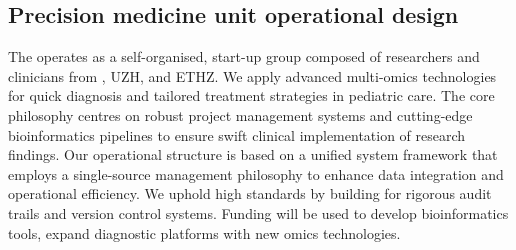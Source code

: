  \subsection{Precision medicine unit operational design}
The  \pmu operates as a self-organised, start-up group composed of researchers and clinicians from \kispi, UZH, and ETHZ.
We apply advanced multi-omics technologies for quick diagnosis and tailored treatment strategies in pediatric care. The core philosophy centres on robust project management systems and cutting-edge bioinformatics pipelines to ensure swift clinical implementation of research findings. 
Our operational structure is based on a unified system framework that employs a single-source management philosophy to enhance data integration and operational efficiency. 
We uphold high standards by building for rigorous audit trails and version control systems. 
Funding will be used to develop bioinformatics tools, expand diagnostic platforms with new omics technologies. 



